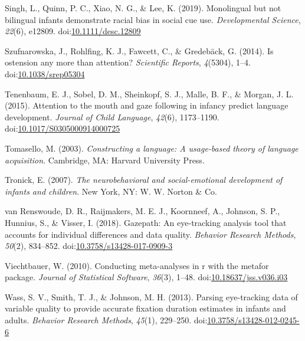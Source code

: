 \documentclass[,man,floatsintext]{apa6}
\begin{document}
\leavevmode\hypertarget{ref-Singh_etal_2019}{}%
Singh, L., Quinn, P. C., Xiao, N. G., \& Lee, K. (2019). Monolingual but not bilingual infants demonstrate racial bias in social cue use. \emph{Developmental Science}, \emph{22}(6), e12809. doi:\href{https://doi.org/10.1111/desc.12809}{10.1111/desc.12809}

\leavevmode\hypertarget{ref-Szufnarowska_etal_2014}{}%
Szufnarowska, J., Rohlfing, K. J., Fawcett, C., \& Gredebäck, G. (2014). Is ostension any more than attention? \emph{Scientific Reports}, \emph{4}(5304), 1--4. doi:\href{https://doi.org/10.1038/srep05304}{10.1038/srep05304}

\leavevmode\hypertarget{ref-Tenenbaum_etal_2015}{}%
Tenenbaum, E. J., Sobel, D. M., Sheinkopf, S. J., Malle, B. F., \& Morgan, J. L. (2015). Attention to the mouth and gaze following in infancy predict language development. \emph{Journal of Child Language}, \emph{42}(6), 1173--1190. doi:\href{https://doi.org/10.1017/S0305000914000725}{10.1017/S0305000914000725}

\leavevmode\hypertarget{ref-Tomasello_2003}{}%
Tomasello, M. (2003). \emph{Constructing a language: A usage-based theory of language acquisition}. Cambridge, MA: Harvard University Press.

\leavevmode\hypertarget{ref-Tronick_2007}{}%
Tronick, E. (2007). \emph{The neurobehavioral and social-emotional development of infants and children}. New York, NY: W. W. Norton \& Co.

\leavevmode\hypertarget{ref-vanRenswoude_etal_2018}{}%
van Renswoude, D. R., Raijmakers, M. E. J., Koornneef, A., Johnson, S. P., Hunnius, S., \& Visser, I. (2018). Gazepath: An eye-tracking analysis tool that accounts for individual differences and data quality. \emph{Behavior Research Methods}, \emph{50}(2), 834--852. doi:\href{https://doi.org/10.3758/s13428-017-0909-3}{10.3758/s13428-017-0909-3}

\leavevmode\hypertarget{ref-Viechtbauer_2010}{}%
Viechtbauer, W. (2010). Conducting meta-analyses in r with the metafor package. \emph{Journal of Statistical Software}, \emph{36}(3), 1--48. doi:\href{https://doi.org/10.18637/jss.v036.i03}{10.18637/jss.v036.i03}

\leavevmode\hypertarget{ref-Wass_etal_2013}{}%
Wass, S. V., Smith, T. J., \& Johnson, M. H. (2013). Parsing eye-tracking data of variable quality to provide accurate fixation duration estimates in infants and adults. \emph{Behavior Research Methods}, \emph{45}(1), 229--250. doi:\href{https://doi.org/10.3758/s13428-012-0245-6}{10.3758/s13428-012-0245-6}
\end{document}
